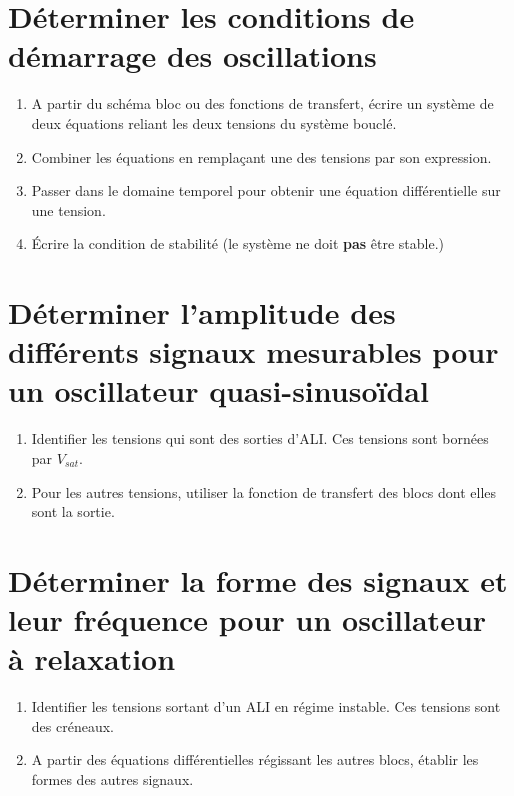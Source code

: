 \section{Déterminer les conditions de démarrage des oscillations}
\begin{enumerate}
    \item A partir du schéma bloc ou des fonctions de transfert, écrire un système de deux équations reliant les deux tensions du système bouclé.
    \item Combiner les équations en remplaçant une des tensions par son expression.
    \item Passer dans le domaine temporel pour obtenir une équation différentielle sur une tension.
    \item Écrire la condition de stabilité (le système ne doit \textbf{pas} être stable.)
\end{enumerate}

\section{Déterminer l’amplitude des différents signaux mesurables pour un oscillateur quasi-sinusoïdal}
\begin{enumerate}
    \item Identifier les tensions qui sont des sorties d'ALI. Ces tensions sont bornées par $V_{sat}$.
    \item Pour les autres tensions, utiliser la fonction de transfert des blocs dont elles sont la sortie.
\end{enumerate}

\section{Déterminer la forme des signaux et leur fréquence pour un oscillateur à relaxation}
\begin{enumerate}
    \item Identifier les tensions sortant d'un ALI en régime instable. Ces tensions sont des créneaux.
    \item A partir des équations différentielles régissant les autres blocs, établir les formes des autres signaux.
\end{enumerate}